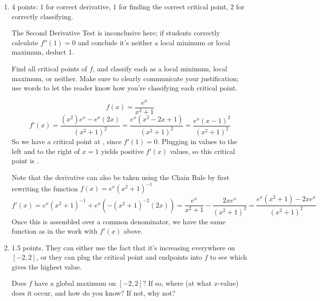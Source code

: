 \documentclass{article}
\begin{document}
\begin{enumerate}
\begin{enumerate}
  \item \label{e^x/(x^2+1)-critical-points}

    \begin{grading}
      4 points: 1 for correct derivative, 1 for finding the correct critical point, 2 for correctly classifying.

      The Second Derivative Test is inconclusive here; if students correctly calculate $f''(1) = 0$ and conclude it's neither a local minimum or local maximum, deduct 1. 
    \end{grading}

    \begin{problem}[\vfill]
      Find all critical points of $f$, and classify each as a local minimum, local maximum, or neither. Make sure to clearly communicate your justification; use words to let the reader know how you're classifying each critical point.
    \end{problem}

    \begin{solution}
      $$f(x)=\displaystyle \frac{e^x}{x^2+1}$$ $$f'(x)=\displaystyle \frac{(x^2)e^x-e^x(2x)}{(x^2+1)^2}=\displaystyle \frac{e^x(x^2-2x+1)}{(x^2+1)^2}=\displaystyle \frac{e^x(x-1)^2}{(x^2+1)^2}$$ So we have a critical point at , since $f'(1)=0$. Plugging in values to the left and to the right of $x=1$ yields positive $f'(x)$ values, so this critical point is .

      Note that the derivative can also be taken using the Chain Rule by first rewriting the function $f(x) = e^x(x^2+1)^{-1}$
      $$f'(x) = e^x(x^2+1)^{-1}+e^x(-(x^2+1)^{-2}(2x))=\frac{e^x}{x^2+1}-\frac{2xe^x}{(x^2+1)^2}=\frac{e^x(x^2+1)-2xe^x}{(x^2+1)^2}$$
      Once this is assembled over a common denominator, we have the same function as in the work with $f'(x)$ above. 
    \end{solution}

  \item

    \begin{grading}
      1.5 points. They can either use the fact that it's increasing everywhere on $[-2, 2]$, or they can plug the critical point and endpoints into $f$ to see which gives the highest value. 
    \end{grading}

    \begin{problem}[\nstretch{0.5}]
      Does $f$ have a global maximum on $[-2, 2]$? If so, where (at what $x$-value) does it occur, and how do you know? If not, why not?      
    \end{problem}


\end{enumerate}
\end{enumerate}
\end{document}
